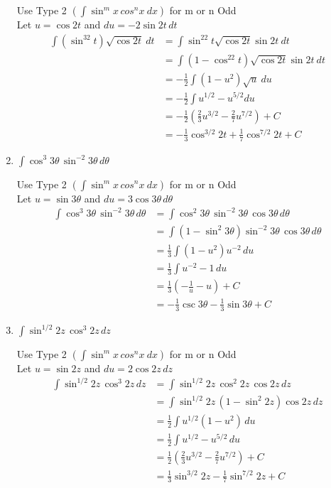 \documentclass[12pt]{article}
\begin{document}
\begin{enumerate}
Use Type 2 $\left(\int \sin^mx\,cos^nx \ dx \right)$ for m or n Odd \\
Let $u=\cos2t$ and $du=-2\sin2t\,dt$
\begin{equation*}
  \begin{aligned}
  \int (\sin^32t)\sqrt{\cos2t}\ dt &= \int\sin^22t\sqrt{\cos2t}\sin2t\ dt \\
  &=\int(1-\cos^22t)\sqrt{\cos2t}\sin2t\ dt \\
  &=-\frac{1}{2}\int(1-u^2)\sqrt{u}\ du \\
  &=-\frac{1}{2}\int u^{1/2}-u^{5/2} du \\
  &=-\frac{1}{2}\left(\frac{2}{3}u^{3/2}-\frac{2}{7}u^{7/2}\right)+C\\
  &= -\frac{1}{3}\cos^{3/2}2t+\frac{1}{7}\cos^{7/2}2t + C
  \end{aligned}
\end{equation*}

\item $\displaystyle\int\cos^{3}3\theta\,\sin^{-2}3\theta\,d\theta$

Use Type 2 $\left(\int \sin^mx\,cos^nx \ dx \right)$ for m or n Odd \\
Let $u=\sin3\theta$ and $du=3\cos3\theta\,d\theta$
\begin{equation*}
  \begin{aligned}
  \int\cos^{3}3\theta\,\sin^{-2}3\theta\,d\theta&=\int\cos^{2}3\theta\,\sin^{-2}3\theta\,\cos3\theta\,d\theta\\
  &=\int(1-\sin^{2}3\theta)\sin^{-2}3\theta\,\cos3\theta\,d\theta\\
  &=\frac{1}{3}\int(1-u^{2})u^{-2}\,du\\
  &=\frac{1}{3}\int u^{-2}-1\,du\\
  &=\frac{1}{3}\left(-\frac{1}{u}-u\right) + C\\
  &= -\frac{1}{3}\csc3\theta-\frac{1}{3}\sin3\theta + C
  \end{aligned}
\end{equation*}

\item $\displaystyle\int\sin^{1/2}2z\,\cos^{3}2z\,dz$

Use Type 2 $\left(\int \sin^mx\,cos^nx \ dx \right)$ for m or n Odd \\
Let $u=\sin2z$ and $du=2\cos2z\,dz$
\begin{equation*}
  \begin{aligned}
  \int\sin^{1/2}2z\,\cos^{3}2z\,dz &=\int\sin^{1/2}2z\,\cos^{2}2z\,\cos2z\,dz\\
  &=\int\sin^{1/2}2z\,(1-\sin^{2}2z)\cos2z\,dz\\
  &=\frac{1}{2}\int u^{1/2}(1-u^{2})\,du\\
  &=\frac{1}{2}\int u^{1/2}-u^{5/2}\,du\\
  &=\frac{1}{2}\left(\frac{2}{3}u^{3/2}-\frac{2}{7}u^{7/2}\right)+C\\
  &=\frac{1}{3}\sin^{3/2}2z-\frac{1}{7}\sin^{7/2}2z+C
  \end{aligned}
\end{equation*}
\end{enumerate}
\end{document}
